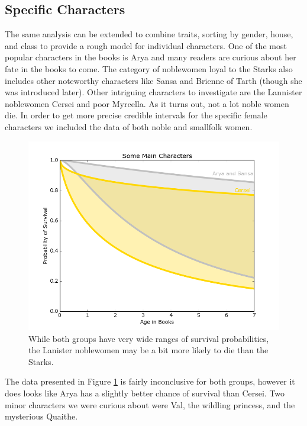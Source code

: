 \documentclass{article}
\begin{document}
\subsection{Specific Characters}

The same analysis can be extended to combine traits, sorting by gender, house, and class to provide a rough model for individual characters.
One of the most popular characters in the books is Arya and many readers are curious about her fate in the books to come. The category of noblewomen loyal to the Starks also includes other noteworthy characters like Sansa and Brienne of Tarth (though she was introduced later). Other intriguing characters to investigate are the Lannister noblewomen Cersei and poor Myrcella.  As it turns out, not a lot noble women die.  In order to get more precise credible intervals for the specific female characters we included the data of both noble and smallfolk women. 

\begin{figure}[ht!]
\centering
\includegraphics[width=6in]{Fem1.png}
\caption{While both groups have very wide ranges of survival probabilities, the Lanister noblewomen may be a bit more likely to die than the Starks.}
\label{fig:specwomen}
\end{figure}

The data presented in Figure \ref{fig:specwomen} is fairly inconclusive for both groups, however it does looks like Arya has a slightly better chance of survival than Cersei. Two minor characters we were curious about were Val, the wildling princess, and the mysterious Quaithe. 
\newpage
\end{document}
